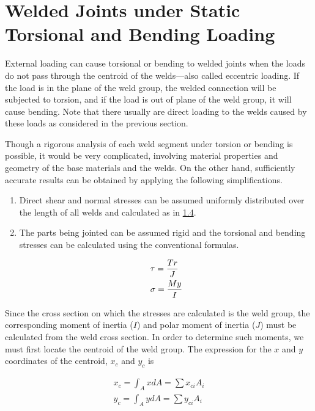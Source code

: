 \documentclass[a4paper,openany,12pt]{book}
\begin{document}
{{\section{Welded Joints under Static Torsional and Bending Loading}
\label{welded-joints-under-static-torsional-and-bending-loading}
External loading can cause torsional or bending to welded joints when
the loads do not pass through the centroid of the welds---also called
eccentric loading. If the load is in the plane of the weld group, the
welded connection will be subjected to torsion, and if the load is out
of plane of the weld group, it will cause bending. Note that there
usually are direct loading to the welds caused by these loads as
considered in the previous section.

Though a rigorous analysis of each weld segment under torsion or bending
is possible, it would be very complicated, involving material properties
and geometry of the base materials and the welds. On the other hand,
sufficiently accurate results can be obtained by applying the following
simplifications.

\begin{enumerate}
\item Direct shear and normal stresses can be assumed uniformly distributed
over the length of all welds and calculated as in
\hyperref[section: stress in weld under axial and shear]{1.4}.

\item The parts being jointed can be assumed rigid and the torsional and
bending stresses can be calculated using the conventional formulas.

$$\begin{gathered}
       \tau  = \frac{Tr}{J} \hfill \\
       \sigma  = \frac{My}{I} \hfill \\ 
     \end{gathered}$$
\end{enumerate}

Since the cross section on which the stresses are calculated is the weld
group, the corresponding moment of inertia (\(I\)) and polar moment of
inertia (\(J\)) must be calculated from the weld cross section. In order
to determine such moments, we must first locate the centroid of the weld
group. The expression for the \(x\) and \(y\) coordinates of the centroid,
\(x_c\) and \(y_c\) is

$$\begin{aligned}
  x_c = \int_A xdA = \sum x_{ci}A_i \\
  y_c = \int_A ydA = \sum y_{ci}A_i\end{aligned}$$

}}
\end{document}
